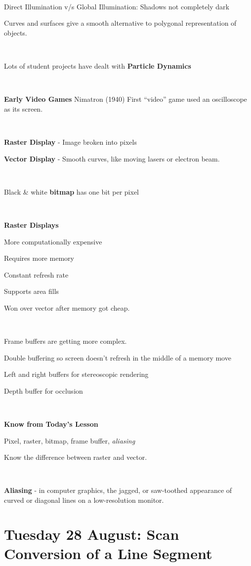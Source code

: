 \documentclass[12pt]{article}
\begin{document}
\begin{spacing}{1.2}
\

Direct Illumination v/s Global Illumination:  Shadows not completely dark

Curves and surfaces give a smooth alternative to polygonal representation of objects.  

\

Lots of student projects have dealt with {\bf Particle Dynamics}

\

{\bf Early Video Games}  Nimatron (1940)  First ``video'' game used an oscilloscope as its screen.  

\

{\bf Raster Display} - Image broken into pixels

{\bf Vector Display} - Smooth curves, like moving lasers or electron beam.  

\

Black \& white {\bf bitmap} has one bit per pixel

\

{\bf Raster Displays}

More computationally expensive

Requires more memory

Constant refresh rate

Supports area fills

Won over vector after memory got cheap.  

\

Frame buffers are getting more complex.  

\qquad Double buffering so screen doesn't refresh in the middle of a memory move

\qquad Left and right buffers for stereoscopic rendering

\qquad Depth buffer for occlusion

\

{\bf Know from Today's Lesson}

Pixel, raster, bitmap, frame buffer, {\it aliasing}

Know the difference between raster and vector.  

\

{\bf Aliasing} - in computer graphics, the jagged, or saw-toothed appearance of curved or diagonal lines on a low-resolution monitor.

\section{Tuesday 28 August:  Scan Conversion of a Line Segment}


\end{spacing}
\end{document}

